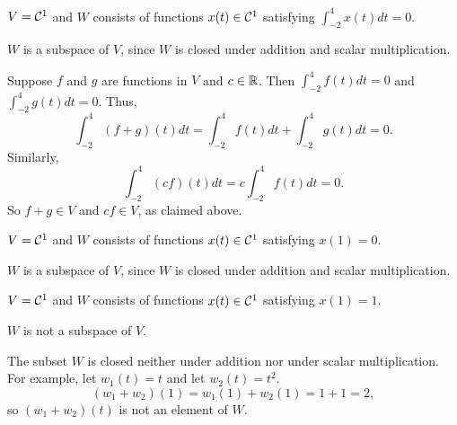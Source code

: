 \documentclass{ximera}
\begin{document}
\begin{exercise} \label{c5.1.4g}
$V={\cal C}^1$ and $W$ consists of functions
     $x(t)\in{\cal C}^1$ satisfying $\int_{-2}^4x(t)dt =0$.

\begin{solution}

\ans $W$ is a subspace of $V$, since $W$ is closed under
addition and scalar multiplication.

\soln Suppose $f$ and $g$ are functions in $V$ and $c \in \mbox{$\mathbb{R}$}$.  Then $\int_{-2}^4f(t)dt =0$ and $\int_{-2}^4g(t)dt =0$.  Thus, 
\[
\int_{-2}^4(f+g)(t)dt = \int_{-2}^4f(t)dt  + \int_{-2}^4g(t)dt = 0.  
\]
Similarly, 
\[
\int_{-2}^4(cf)(t)dt = c\int_{-2}^4f(t)dt = 0.
\]
So $f+g \in V$ and $cf \in V$, as claimed above.   

\end{solution}
\end{exercise}
\begin{exercise} \label{c5.1.4e}
$V={\cal C}^1$ and $W$ consists of functions
     $x(t)\in{\cal C}^1$ satisfying $x(1)=0$.

\begin{solution}
$W$ is a subspace of $V$, since $W$ is closed under
addition and scalar multiplication.

\end{solution}
\end{exercise}
\begin{exercise} \label{c5.1.4f}
$V={\cal C}^1$ and $W$ consists of functions
     $x(t)\in{\cal C}^1$ satisfying $x(1)=1$.

\begin{solution}
\ans $W$ is not a subspace of $V$.

\soln The subset $W$ is closed neither under addition nor under scalar
multiplication.  For example, let $w_1(t) = t$ and let $w_2(t) = t^2$.
\[
(w_1 + w_2)(1) = w_1(1) + w_2(1) = 1 + 1 = 2,
\]
so $(w_1 + w_2)(t)$ is not an element of $W$.


\end{solution}
\end{exercise}
\end{document}
